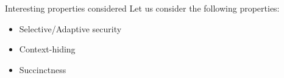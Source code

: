 \begin{frame}{Interesting properties considered}
  Let us consider the following properties:
  \begin{itemize}
  \item Selective/Adaptive security
  \item Context-hiding
  \item Succinctness
  \end{itemize}
\end{frame}
